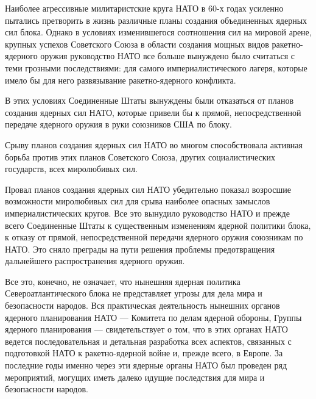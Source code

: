 \documentclass[12pt, a4paper, openany]{book}
\begin{document}
	Наиболее агрессивные милитаристские круга НАТО в 60-х годах усиленно пытались претворить в жизнь различные планы создания объединенных ядерных сил блока. Однако в условиях изменившегося соотношения сил на мировой арене, крупных успехов Советского Союза в области создания мощных видов ракетно-ядерного оружия руководство НАТО все больше вынуждено было считаться с теми грозными последствиями: для самого империалистического лагеря, которые имело бы для него развязывание ракетно-ядерного конфликта.
	
	В этих условиях Соединенные Штаты вынуждены были отказаться от планов создания ядерных сил НАТО, которые привели бы к прямой, непосредственной передаче ядерного оружия в руки союзников США по блоку.
	
	Срыву планов создания ядерных сил НАТО во многом способствовала активная борьба против этих планов Советского Союза, других социалистических государств, всех миролюбивых сил.
	
	Провал планов создания ядерных сил НАТО убедительно показал возросшие возможности миролюбивых сил для срыва наиболее опасных замыслов империалистических кругов. Все это вынудило руководство НАТО и прежде всего Соединенные Штаты к существенным изменениям ядерной политики блока, к отказу от прямой, непосредственной передачи ядерного оружия союзникам по НАТО. Это сняло преграды на пути решения проблемы предотвращения дальнейшего распространения ядерного оружия.
	
	Все это, конечно, не означает, что нынешняя ядерная политика Североатлантического блока не представляет угрозы для дела мира и безопасности народов. Вся практическая деятельность нынешних органов ядерного планирования НАТО — Комитета по делам ядерной обороны, Группы ядерного планирования — свидетельствует о том, что в этих органах НАТО ведется последовательная и детальная разработка всех аспектов, связанных с подготовкой НАТО к ракетно-ядерной войне и, прежде всего, в Европе. За последние годы именно через эти ядерные органы НАТО был проведен ряд мероприятий, могущих иметь далеко идущие последствия для мира и безопасности народов.
	
\end{document}
